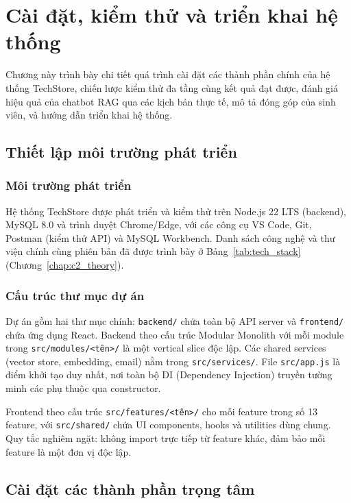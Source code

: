 \chapter{Cài đặt, kiểm thử và triển khai hệ thống}
\label{chap:c4_implementation}

Chương này trình bày chi tiết quá trình cài đặt các thành phần chính của hệ thống TechStore, chiến lược kiểm thử đa tầng cùng kết quả đạt được, đánh giá hiệu quả của chatbot RAG qua các kịch bản thực tế, mô tả đóng góp của sinh viên, và hướng dẫn triển khai hệ thống.

\section{Thiết lập môi trường phát triển}
\label{sec:c4_environment}

\subsection{Môi trường phát triển}

Hệ thống TechStore được phát triển và kiểm thử trên Node.js 22 LTS (backend), MySQL 8.0 và trình duyệt Chrome\slash Edge, với các công cụ VS Code, Git, Postman (kiểm thử API) và MySQL Workbench. Danh sách công nghệ và thư viện chính cùng phiên bản đã được trình bày ở Bảng~\ref{tab:tech_stack} (Chương~\ref{chap:c2_theory}).

\subsection{Cấu trúc thư mục dự án}

Dự án gồm hai thư mục chính: \texttt{backend/} chứa toàn bộ API server và \texttt{frontend/} chứa ứng dụng React. Backend theo cấu trúc Modular Monolith với mỗi module trong \texttt{src/modules/<tên>/} là một vertical slice độc lập. Các shared services (vector store, embedding, email) nằm trong \texttt{src/services/}. File \texttt{src/app.js} là điểm khởi tạo duy nhất, nơi toàn bộ DI (Dependency Injection) truyền tường minh các phụ thuộc qua constructor.

Frontend theo cấu trúc \texttt{src/features/<tên>/} cho mỗi feature trong số 13 feature, với \texttt{src/shared/} chứa UI components, hooks và utilities dùng chung. Quy tắc nghiêm ngặt: không import trực tiếp từ feature khác, đảm bảo mỗi feature là một đơn vị độc lập.

\section{Cài đặt các thành phần trọng tâm}
\label{sec:c4_key_impl}

